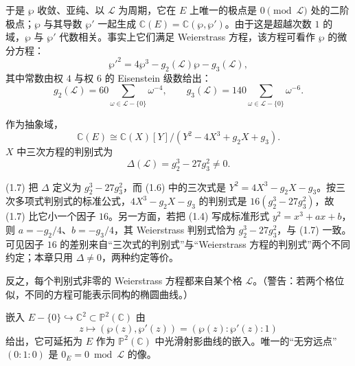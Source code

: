 于是 $\wp$ 收敛、亚纯、以 $\mathcal{L}$ 为周期，它在 $E$ 上唯一的极点是 $0\pmod{\mathcal{L}}$ 处的二阶极点；$\wp$ 与其导数 $\wp'$ 一起生成 $\mathbb{C}(E)=\mathbb{C}(\wp,\wp')$。由于这是超越次数 $1$ 的域，$\wp$ 与 $\wp'$ 代数相关。事实上它们满足 Weierstrass 方程，该方程可看作 $\wp$ 的微分方程：
\begin{equation}\tag{1.4}\label{c5:eq:1.4}
\wp'^2=4\wp^3-g_2(\mathcal{L})\wp-g_3(\mathcal{L}),
\end{equation}
其中常数由权 $4$ 与权 $6$ 的 Eisenstein 级数给出：
\begin{equation}\tag{1.5}\label{c5:eq:1.5}
g_2(\mathcal{L})=60\sum_{\omega\in\mathcal{L}-\{0\}}\omega^{-4},\qquad
g_3(\mathcal{L})=140\sum_{\omega\in\mathcal{L}-\{0\}}\omega^{-6}.
\end{equation}

作为抽象域，
\begin{equation}\tag{1.6}\label{c5:eq:1.6}
\mathbb{C}(E)\cong\mathbb{C}(X)[Y]/(Y^2-4X^3+g_2X+g_3).
\end{equation}
$X$ 中三次方程的判别式为
\begin{equation}\tag{1.7}\label{c5:eq:1.7}
\Delta(\mathcal{L})=g_2^3-27g_3^2\neq0.
\end{equation}

\begin{annote}
(1.7) 把 $\Delta$ 定义为 $g_2^3-27g_3^2$，而 (1.6) 中的三次式是 $Y^2=4X^3-g_2X-g_3$。按三次多项式判别式的标准公式，$4X^3-g_2X-g_3$ 的判别式是 $16(g_2^3-27g_3^2)$，故 (1.7) 比它小一个因子 $16$。另一方面，若把 (1.4) 写成标准形式 $y^2=x^3+ax+b$，则 $a=-g_2/4$、$b=-g_3/4$，其 Weierstrass 判别式恰为 $g_2^3-27g_3^2$，与 (1.7) 一致。可见因子 $16$ 的差别来自“三次式的判别式”与“Weierstrass 方程的判别式”两个不同约定；本章只用 $\Delta\neq0$，两种约定等价。
\par\vspace{0.15em}{\raggedleft 【来源：Silverman《The Arithmetic of Elliptic Curves》第 III 章（A）；原书 (1.4)--(1.7)（A）】\par}
\end{annote}

反之，每个判别式非零的 Weierstrass 方程都来自某个格 $\mathcal{L}$。（警告：若两个格位似，不同的方程可能表示同构的椭圆曲线。）

嵌入 $E-\{0\}\hookrightarrow\mathbb{C}^2\subset\mathbb{P}^2(\mathbb{C})$ 由
\begin{equation}\tag{1.8}\label{c5:eq:1.8}
z\longmapsto(\wp(z),\wp'(z))=(\wp(z):\wp'(z):1)
\end{equation}
给出，它可延拓为 $E$ 作为 $\mathbb{P}^2(\mathbb{C})$ 中光滑射影曲线的嵌入。唯一的“无穷远点” $(0:1:0)$ 是 $0_E=0\bmod\mathcal{L}$ 的像。

